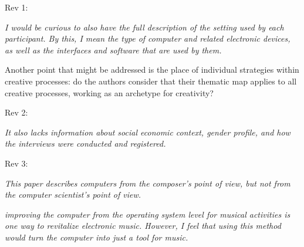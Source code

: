 Rev 1: 

\textit{I would be curious to also have the full description of the setting
used by each participant. By this, I mean the type of computer and
related electronic devices, as well as the interfaces and software
that are used by them.}

Another point that might be addressed is the
place of individual strategies within creative processes: do the
authors consider that their thematic map applies to all creative
processes, working as an archetype for creativity?

Rev 2:

\textit{It also lacks information about social economic context, gender
profile, and how the interviews were conducted and registered.}

Rev 3:

\textit{This paper describes computers from the composer's point of view, but
not from the computer scientist's point of view.}

\textit{improving the computer from the operating system level for musical
activities is one way to revitalize electronic music. However, I feel
that using this method would turn the computer into just a tool for
music.}